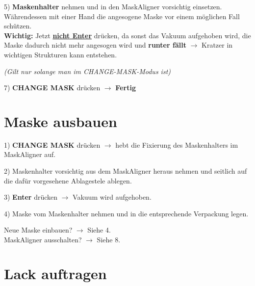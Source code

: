 \documentclass[
  ngerman,
  twoside,
  captions=tableheading,
  BCOR=.5cm,
  fontsize=11,
  ]{scrreprt}
\begin{document}
\begin{description}
\item 5) \textbf{Maskenhalter} nehmen und in den MaskAligner vorsichtig einsetzen. Währendessen mit einer Hand die angesogene Maske vor einem möglichen Fall schützen.\\
\textbf{Wichtig:} Jetzt \textbf{\underline{nicht Enter}} drücken, da sonst das Vakuum aufgehoben wird, die Maske dadurch nicht mehr angesogen wird und \textbf{runter fällt} $\rightarrow$ Kratzer in wichtigen Strukturen kann entstehen. 
\begin{center}
\textit{(Gilt nur solange man im CHANGE-MASK-Modus ist)}
\end{center}

\item 7) \textbf{CHANGE MASK} drücken $\rightarrow$ \textbf{Fertig}
\end{description}

\chapter{Maske ausbauen}
\begin{description}
\item 1) \textbf{CHANGE MASK} drücken $\rightarrow$ hebt die Fixierung des Maskenhalters im MaskAligner auf.

\item 2) Maskenhalter vorsichtig aus dem MaskAligner heraus nehmen und seitlich auf die dafür vorgesehene Ablagestele ablegen.

\item 3) \textbf{Enter} drücken $\rightarrow$ Vakuum wird aufgehoben. 

\item 4) Maske vom Maskenhalter nehmen und in die entsprechende Verpackung legen.

Neue Maske einbauen? $\rightarrow$ Siehe 4.\\
MaskAligner ausschalten? $\rightarrow$ Siehe 8.\\

\end{description}


\newpage

\chapter{Lack auftragen}
\end{document}
